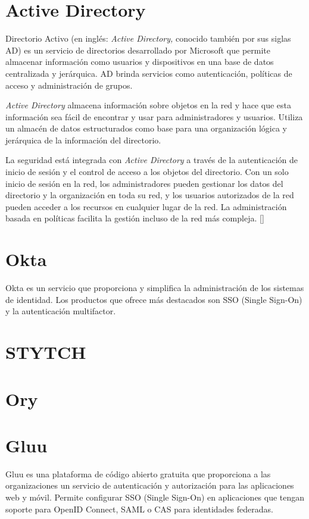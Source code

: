 \section{Active Directory}
Directorio Activo (en inglés: \textit{Active Directory,} conocido también por sus siglas AD) es un servicio de directorios desarrollado por Microsoft que permite almacenar información como usuarios y dispositivos en una base de datos centralizada y jerárquica. AD brinda servicios como autenticación, políticas de acceso y administración de grupos.

\textit{Active Directory} almacena información sobre objetos en la red y hace que esta información sea fácil de encontrar y usar para administradores y usuarios. Utiliza un almacén de datos estructurados como base para una organización lógica y jerárquica de la información del directorio.

La seguridad está integrada con \textit{Active Directory }a través de la autenticación de inicio de sesión y el control de acceso a los objetos del directorio. Con un solo inicio de sesión en la red, los administradores pueden gestionar los datos del directorio y la organización en toda su red, y los usuarios autorizados de la red pueden acceder a los recursos en cualquier lugar de la red. La administración basada en políticas facilita la gestión incluso de la red más compleja.
[\cite{active-directoy-doc}]



\section{Okta}
Okta es un servicio que proporciona y simplifica la administración de los sistemas de identidad. Los productos que ofrece más destacados son SSO (Single Sign-On) y la autenticación multifactor.

\section{STYTCH}

\section{Ory}

\section{Gluu}
Gluu es una plataforma de código abierto gratuita que proporciona a las organizaciones un servicio de autenticación y autorización para las aplicaciones web y móvil. Permite configurar SSO (Single Sign-On) en aplicaciones que tengan soporte para OpenID Connect, SAML o  CAS para identidades federadas.

